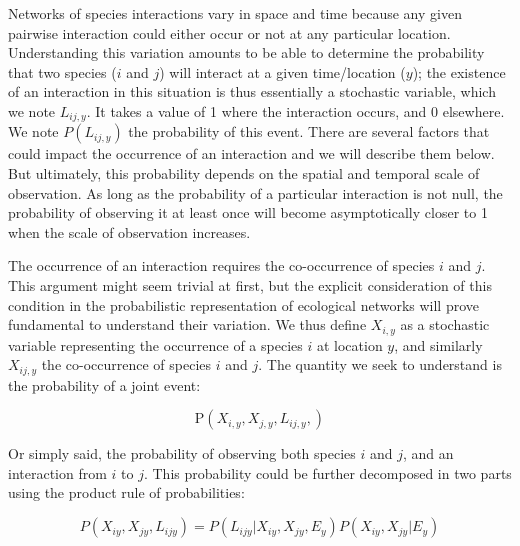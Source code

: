 \documentclass[12pt]{article}
\begin{document}
Networks of species interactions vary in space and time because any given
pairwise interaction could either occur or not at any particular location.
Understanding this variation amounts to be able to determine the probability
that two species ($i$ and $j$) will interact at a given time/location ($y$);
the existence of an interaction in this situation is thus essentially a
stochastic variable, which we note $L_{ij,y}$. It takes a value of 1 where the
interaction occurs, and 0 elsewhere. We note $P(L_{ij,y})$ the probability
of this event. There are several factors that could impact the occurrence
of an interaction and we will describe them below. But ultimately, this
probability depends on the spatial and temporal scale of observation. As long
as the probability of a particular interaction is not null, the probability
of observing it at least once will become asymptotically closer to 1 when
the scale of observation increases.

The occurrence of an interaction requires the co-occurrence of species $i$ and
$j$. This argument might seem trivial at first, but the explicit consideration
of this condition in the probabilistic representation of ecological networks
will prove fundamental to understand their variation.
We thus define $X_{i,y}$
as a stochastic variable representing the occurrence of a species $i$ at
location $y$, and similarly $X_{ij,y}$ the co-occurrence of species $i$ and
$j$. The quantity we seek to understand is the probability of a joint event:

\begin{equation}
\text{P}(X_{i,y},X_{j,y},L_{ij,y},)
\end{equation}

Or simply said, the probability of observing both species $i$ and $j$, and
an interaction from $i$ to $j$. This probability could be further decomposed
in two parts using the product rule of probabilities:

\begin{equation}
P(X_{iy},X_{jy},L_{ijy})=P(L_{ijy}|X_{iy},X_{jy},E_y)P(X_{iy},X_{jy}|E_y)
\end{equation}
\end{document}
